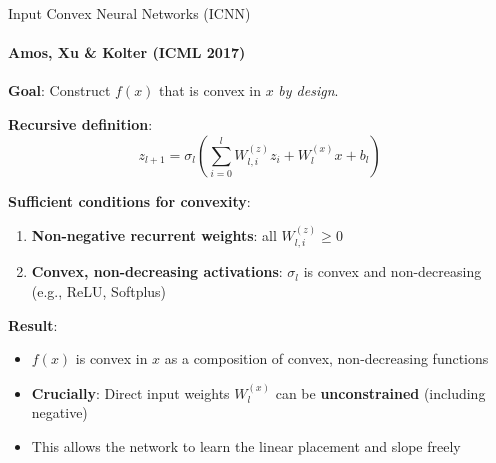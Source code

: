 \documentclass[10pt,english,aspectratio=169]{beamer}
\begin{document}
\begin{frame}{Input Convex Neural Networks (ICNN)}
\framesubtitle{Amos, Xu \& Kolter (ICML 2017)}
\textbf{Goal}: Construct $f(x)$ that is convex in $x$ \emph{by design}.

\vspace{0.2cm}
\textbf{Recursive definition}:
\[
  z_{l+1} = \sigma_l\left(\sum_{i=0}^l W_{l,i}^{(z)} z_i + W_l^{(x)} x + b_l\right)
\]

\textbf{Sufficient conditions for convexity}:
\begin{enumerate}
  \item \textbf{Non-negative recurrent weights}: all $W_{l,i}^{(z)} \geq 0$
  \item \textbf{Convex, non-decreasing activations}: $\sigma_l$ is convex and non-decreasing (e.g., ReLU, Softplus)
\end{enumerate}

\textbf{Result}:
\begin{itemize}
  \item $f(x)$ is convex in $x$ as a composition of convex, non-decreasing functions
  \item \textbf{Crucially}: Direct input weights $W_l^{(x)}$ can be \textbf{unconstrained} (including negative)
  \item This allows the network to learn the linear placement and slope freely
\end{itemize}
\end{frame}
\end{document}
